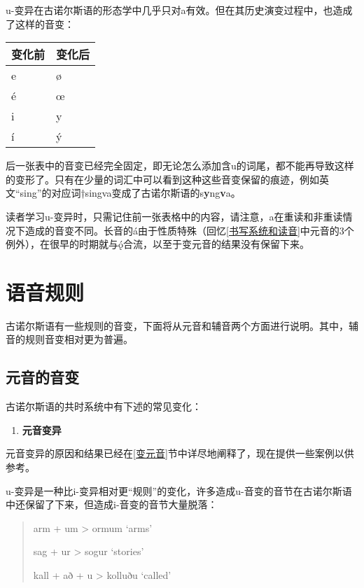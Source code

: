 u-变异在古诺尔斯语的形态学中几乎只对a有效。但在其历史演变过程中，也造成了这样的音变：

\begin{longtable}{ll}
  \toprule
  变化前 & 变化后 \\
  \midrule
  \endhead
  \bottomrule
  \endfoot
  e      & ø      \\
  é      & œ      \\
  i      & y      \\
  í      & ý      \\
\end{longtable}

后一张表中的音变已经完全固定，即无论怎么添加含u的词尾，都不能再导致这样的变形了。只有在少量的词汇中可以看到这种这些音变保留的痕迹，例如英文``sing''的对应词†singva变成了古诺尔斯语的s\textbf{y}ng\textbf{v}a。

读者学习u-变异时，只需记住前一张表格中的内容，请注意，a在重读和非重读情况下造成的音变不同。长音的á由于性质特殊（回忆\ref{书写系统和读音}中元音的3个例外），在很早的时期就与ǫ́合流，以至于变元音的结果没有保留下来。

\section{语音规则}\label{语音规则}

古诺尔斯语有一些规则的音变，下面将从元音和辅音两个方面进行说明。其中，辅音的规则音变相对更为普遍。

\subsection{元音的音变}\label{元音的音变}

古诺尔斯语的共时系统中有下述的常见变化：

\begin{enumerate}
  \def\labelenumi{\Alph{enumi}.}
  \item
        \label{_Ref117017033}{}\textbf{元音变异}
\end{enumerate}

元音变异的原因和结果已经在\ref{变元音}节中详尽地阐释了，现在提供一些案例以供参考。

u-变异是一种比i-变异相对更``规则''的变化，许多造成u-音变的音节在古诺尔斯语中还保留了下来，但造成i-音变的音节大量脱落：

\begin{quote}
  arm + um \textgreater{} ormum `arms'

  sag + ur \textgreater{} sogur `stories'

  kall + að + u \textgreater{} kolluðu `called'
\end{quote}

